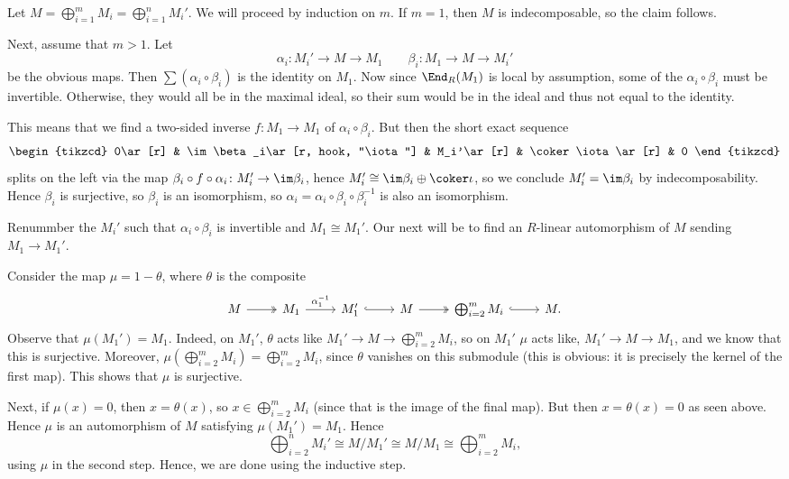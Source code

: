 Let $M = \bigoplus_{i=1}^m M_i = \bigoplus_{i = 1}^n M_i'$. We will proceed by
induction on $m$. If $m = 1$, then $M$ is indecomposable, so the claim follows.

Next, assume that $m>1$. Let
\[ \alpha_i\colon M_i'\to M\to M_1\qquad \beta_i\colon M_1\to M\to M_i' \]
be the obvious maps. Then $\sum (\alpha_i \circ \beta_i)$ is the identity on $M_1$.
Now since $\End_R(M_1)$ is local by assumption, some of the $\alpha_i \circ \beta_i$
must be invertible. Otherwise, they would all be in the maximal ideal, so
their sum would be in the ideal and thus not equal to the identity.

This means that we find a two-sided inverse $f\colon M_1 \to M_1$ of $\alpha_i \circ \beta_i$.
But then the short exact sequence
\[\begin{tikzcd}
	0\ar[r] & \im \beta_i\ar[r, hook, "\iota"] & M_i'\ar[r] & \coker\iota\ar[r] & 0
\end{tikzcd}\]
splits on the left via the map $\beta_i \circ f \circ \alpha_i\colon M_i'\to \im\beta_i$,
hence $M_i'\cong \im\beta_i\oplus \coker \iota$, so we conclude $M_i' = \im\beta_i$
by indecomposability. Hence $\beta_i$ is surjective, so $\beta_i$ is an isomorphism,
so $\alpha_i = \alpha_i \circ \beta_i \circ \beta_i^{-1}$ is also an isomorphism.

Renummber the $M_i'$ such that $\alpha_i \circ \beta_i$ is invertible and
$M_1\cong M_1'$. Our next will be to find an $R$-linear automorphism of $M$ sending
$M_1\to M_1'$.

Consider the map $\mu = 1 - \theta$, where $\theta$ is the composite
\[\begin{tikzcd}
	M\ar[r, two heads] & M_1\ar[r, "\alpha_1^{-1}"] & M_1'\ar[r, hook] & M\ar[r, two heads] & \bigoplus_{i = 2}^m M_i\ar[r, hook] & M.
\end{tikzcd}\]
Observe that $\mu(M_1') = M_1$. Indeed, on $M_1'$, $\theta$ acts like
$M_1' \to M \to \bigoplus_{i=2}^m M_i$, so on $M_1'$ $\mu$ acts like,
$M_1'\to M\to M_1$, and we know that this is surjective.
Moreover, $\mu(\bigoplus_{i=2}^m M_i) = \bigoplus_{i=2}^m M_i$, since $\theta$
vanishes on this submodule (this is obvious: it is precisely the kernel of
the first map).
This shows that $\mu$ is surjective.

Next, if $\mu(x) = 0$, then $x = \theta(x)$, so $x \in \bigoplus_{i=2}^m M_i$ (since
that is the image of the final map). But then $x = \theta(x) = 0$ as seen above.
Hence $\mu$ is an automorphism of $M$ satisfying $\mu(M_1') = M_1$. Hence
\[\bigoplus_{i = 2}^n M_i' \cong M/M_1' \cong M/M_1 \cong \bigoplus_{i=2}^m M_i, \]
using $\mu$ in the second step. Hence, we are done using the inductive step.
